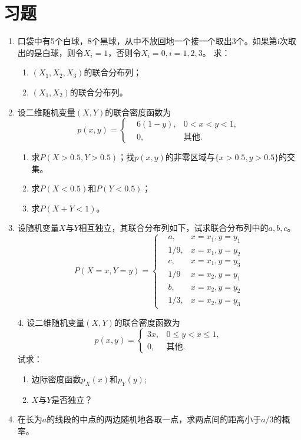 \section{习题}
\begin{enumerate}
    \item 口袋中有5个白球，8个黑球，从中不放回地一个接一个取出3个。如果第i次取出的是白球，则令$X_i = 1$，否则令$X_i = 0,i = 1,2,3$。
求：
\begin{enumerate}
    \item $(X_1,X_2,X_3)$的联合分布列；
\item $(X_1,X_2)$的联合分布列。
\end{enumerate}

\item  设二维随机变量$(X,Y)$的联合密度函数为
$$
	 p(x,y) = \left\{
	 \begin{aligned}
	   &  6(1-y), &  0 < x < y < 1,\\
	 &0, & \text{其他}.
	 \end{aligned}
	 \right.	 
$$
\begin{enumerate}
    \item 求$P(X > 0.5,Y >0.5)$；找$p(x,y)$的非零区域与$\{x>0.5,y>0.5\}$的交集。
\item 求$P(X < 0.5)$和$P(Y < 0.5)$；
\item 求$P(X + Y < 1)$。
\end{enumerate}

\item  设随机变量$X$与$Y$相互独立，其联合分布列如下，试求联合分布列中的$a,b,c$。
$$
P(X=x,Y=y) = \left\{
\begin{aligned}
 &   a, &x=x_1, y=y_1\\
& 1/9, &x=x_1,y=y_2\\
& c, &x=x_1,y=y_3\\
& 1/9 &x=x_2,y=y_1\\
& b, &x=x_2,y=y_2\\
& 1/3, &x = x_2,y=y_3
\end{aligned}
\right.
$$

4. 设二维随机变量$(X,Y)$的联合密度函数为
$$
p(x,y) = 
	 \begin{cases}
	 3x, &     0 \leq   y  < x  \leq 1,\\
	 0, & \text{其他}.
	\end{cases}
$$
试求：
\begin{enumerate}
    \item 边际密度函数$p_X(x)$和$p_Y(y)$; 
    \item $X$与$Y$是否独立？
\end{enumerate}

\item  在长为$a$的线段的中点的两边随机地各取一点，求两点间的距离小于$a/3$的概率。
\end{enumerate}
